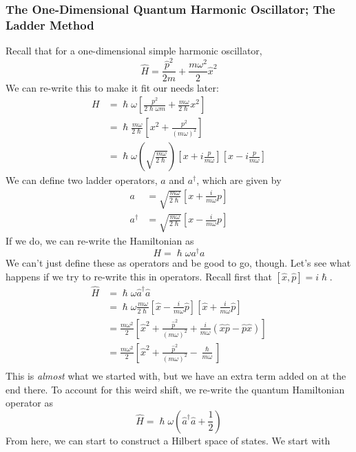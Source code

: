 \documentclass[a4paper]{article}
\begin{document}
\subsubsection{The One-Dimensional Quantum Harmonic Oscillator; The Ladder
	Method}
Recall that for a one-dimensional simple harmonic oscillator,
\[ \hat{H} = \frac{\hat{p}^2}{2m} + \frac{m\omega^2}{2}\hat{x}^2 \]
We can re-write this to make it fit our needs later:
\begin{align*}
	H &= \hslash\omega\left[\frac{p^2}{2\hslash\omega m} +
		\frac{m\omega}{2\hslash}x^2\right]\\
	  &= \hslash\frac{m\omega}{2\hslash}
		\left[x^2+\frac{p^2}{(m\omega)^2}\right]\\
	  &= \hslash\omega\left(\sqrt{\frac{m\omega}{2\hslash}}\right)
		\left[x+i\frac{p}{m\omega}\right]
		\left[x-i\frac{p}{m\omega}\right]
\end{align*}
We can define two ladder operators, $a$ and $a^\dagger$, which are given by
\begin{align*}
	a &= \sqrt{\frac{m\omega}{2\hslash}}\left[x+\frac{i}{m\omega}p\right]\\
	a^\dagger &= \sqrt{\frac{m\omega}{2\hslash}}
		\left[x-\frac{i}{m\omega}p\right]
\end{align*}
If we do, we can re-write the Hamiltonian as
\[ H = \hslash\omega a^\dagger a \]
We can't just define these as operators and be good to go, though. Let's see
what happens if we try to re-write this in operators.
Recall first that $[\hat{x},\hat{p}] = i\hslash$.
\begin{align*}
	\hat{H} &= \hslash\omega\hat{a}^\dagger\hat{a}\\
		&= \hslash\omega\frac{m\omega}{2\hslash}
			\left[\hat{x}-\frac{i}{m\omega}\hat{p}\right]
			\left[\hat{x}+\frac{i}{m\omega}\hat{p}\right]\\
		&= \frac{m\omega^2}{2}\left[\hat{x}^2+
			\frac{\hat{p}^2}{(m\omega)^2} + \frac{i}{m\omega}
			(\hat{x}\hat{p}-\hat{p}\hat{x})\right]\\
		&= \frac{m\omega^2}{2}\left[\hat{x}^2+
			\frac{\hat{p}^2}{(m\omega)^2}
			-\frac{\hslash}{m\omega}\right]\\
\end{align*}
This is \emph{almost} what we started with, but we have an extra term added on
at the end there. To account for this weird shift, we re-write the quantum
Hamiltonian operator as
\[ \hat{H} = \hslash\omega\left(\hat{a}^\dagger\hat{a}+\frac{1}{2}\right) \]
From here, we can start to construct a Hilbert space of states. We start with
\end{document}
